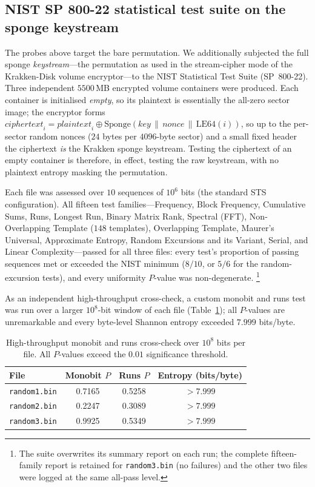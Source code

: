 \documentclass[11pt]{article}
\begin{document}
\subsection{NIST SP 800-22 statistical test suite on the sponge keystream}
The probes above target the bare permutation. We additionally subjected the full
sponge \emph{keystream}---the permutation as used in the stream-cipher mode of
the Krakken-Disk volume encryptor---to the NIST Statistical Test Suite
(SP~800-22). Three independent $5500$\,MB encrypted volume containers were
produced. Each container is initialised \emph{empty}, so its plaintext is
essentially the all-zero sector image; the encryptor forms
$\mathit{ciphertext}_i = \mathit{plaintext}_i \oplus
\mathrm{Sponge}(\mathit{key}\,\|\,\mathit{nonce}\,\|\,\mathrm{LE64}(i))$,
so up to the per-sector random nonces ($24$ bytes per $4096$-byte sector) and a
small fixed header the ciphertext \emph{is} the Krakken sponge keystream. Testing
the ciphertext of an empty container is therefore, in effect, testing the raw
keystream, with no plaintext entropy masking the permutation.

Each file was assessed over $10$ sequences of $10^{6}$ bits (the standard STS
configuration). All fifteen test families---Frequency, Block Frequency,
Cumulative Sums, Runs, Longest Run, Binary Matrix Rank, Spectral (FFT),
Non-Overlapping Template ($148$ templates), Overlapping Template, Maurer's
Universal, Approximate Entropy, Random Excursions and its Variant, Serial, and
Linear Complexity---passed for all three files: every test's proportion of
passing sequences met or exceeded the NIST minimum ($8/10$, or $5/6$ for the
random-excursion tests), and every uniformity $P$-value was non-degenerate.%
\footnote{The suite overwrites its summary report on each run; the complete
fifteen-family report is retained for \texttt{random3.bin} (no failures) and the
other two files were logged at the same all-pass level.}

As an independent high-throughput cross-check, a custom monobit and runs test was
run over a larger $10^{8}$-bit window of each file (Table~\ref{tab:nist_ht}); all
$P$-values are unremarkable and every byte-level Shannon entropy exceeded
$7.999$ bits/byte.

\begin{table}[h]
\centering
\begin{tabular}{lccc}
  \toprule
  \textbf{File} & \textbf{Monobit $P$} & \textbf{Runs $P$} & \textbf{Entropy (bits/byte)} \\
  \midrule
  \texttt{random1.bin} & 0.7165 & 0.5258 & $>7.999$ \\
  \texttt{random2.bin} & 0.2247 & 0.3089 & $>7.999$ \\
  \texttt{random3.bin} & 0.9925 & 0.5349 & $>7.999$ \\
  \bottomrule
\end{tabular}
\caption{High-throughput monobit and runs cross-check over $10^{8}$ bits per
file. All $P$-values exceed the $0.01$ significance threshold.}
\label{tab:nist_ht}
\end{table}
\end{document}
